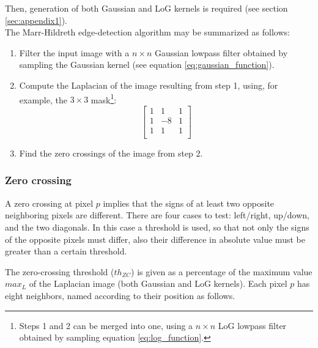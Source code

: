 \documentclass{ipol}
\numberwithin{equation}{section}
\numberwithin{table}{section}
\begin{document}
{Then, generation of both Gaussian and LoG kernels is required (see section \ref{sec:appendix1}).\\

The Marr-Hildreth edge-detection algorithm may be summarized as follows:
\begin{enumerate}
	\item Filter the input image with a $n \times n$ Gaussian lowpass filter obtained by sampling the Gaussian kernel (see equation \ref{eq:gaussian_function}). %
	\item Compute the Laplacian of the image resulting from step 1, using, for example, the $3\times3$ mask\footnote{Steps 1 and 2 can be merged into one, using a $n\times n$ LoG lowpass filter obtained by sampling equation \ref{eq:log_function}.}:
	\begin{equation*}
		\begin{bmatrix}
			1 &  1 & 1 \\
			1 & -8 & 1 \\
			1 &  1 & 1 \\
		\end{bmatrix}
	\end{equation*}
	\item Find the zero crossings of the image from step 2.
\end{enumerate}



\subsubsection{Zero crossing}


A zero crossing at pixel $p$ implies that the signs of at least two opposite neighboring pixels are 
different. There are four cases to test: left/right, up/down, and the two diagonals. In this case 
a threshold is used, so that not only the signs of the opposite pixels must differ, also their 
difference in absolute value must be greater than a certain threshold. 

The zero-crossing threshold ($th_{ZC}$) is given as a percentage of the maximum value $max_L$ of the Laplacian 
image (both Gaussian and LoG kernels). Each pixel $p$ has eight neighbors, named according to their position 
as follows.

}
\end{document}
